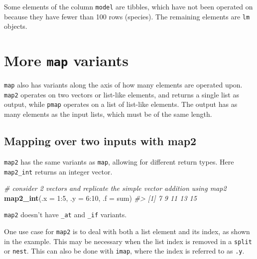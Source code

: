 \documentclass[]{book}
\newenvironment{Shaded}{}{}
\newcommand{\CommentTok}[1]{\textcolor[rgb]{0.38,0.63,0.69}{\textit{#1}}}
\newcommand{\DataTypeTok}[1]{\textcolor[rgb]{0.56,0.13,0.00}{#1}}
\newcommand{\DecValTok}[1]{\textcolor[rgb]{0.25,0.63,0.44}{#1}}
\newcommand{\KeywordTok}[1]{\textcolor[rgb]{0.00,0.44,0.13}{\textbf{#1}}}
\newcommand{\NormalTok}[1]{#1}
\newcommand{\OperatorTok}[1]{\textcolor[rgb]{0.40,0.40,0.40}{#1}}
\begin{document}
Some elements of the column \texttt{model} are tibbles, which have not been operated on because they have fewer than 100 rows (species). The remaining elements are \texttt{lm} objects.

\hypertarget{more-map-variants}{%
\section{\texorpdfstring{More \texttt{map} variants}{More map variants}}\label{more-map-variants}}

\texttt{map} also has variants along the axis of how many elements are operated upon. \texttt{map2} operates on two vectors or list-like elements, and returns a single list as output, while \texttt{pmap} operates on a list of list-like elements.
The output has as many elements as the input lists, which must be of the same length.

\hypertarget{mapping-over-two-inputs-with-map2}{%
\subsection{Mapping over two inputs with map2}\label{mapping-over-two-inputs-with-map2}}

\texttt{map2} has the same variants as \texttt{map}, allowing for different return types.
Here \texttt{map2\_int} returns an integer vector.

\begin{Shaded}
\begin{Highlighting}[]
\CommentTok{# consider 2 vectors and replicate the simple vector addition using map2}
\KeywordTok{map2_int}\NormalTok{(}\DataTypeTok{.x =} \DecValTok{1}\OperatorTok{:}\DecValTok{5}\NormalTok{,}
         \DataTypeTok{.y =} \DecValTok{6}\OperatorTok{:}\DecValTok{10}\NormalTok{,}
         \DataTypeTok{.f =}\NormalTok{ sum)}
\CommentTok{#> [1]  7  9 11 13 15}
\end{Highlighting}
\end{Shaded}

\texttt{map2} doesn't have \texttt{\_at} and \texttt{\_if} variants.

One use case for \texttt{map2} is to deal with both a list element and its index, as shown in the example. This may be necessary when the list index is removed in a \texttt{split} or \texttt{nest}. This can also be done with \texttt{imap}, where the index is referred to as \texttt{.y}.
\end{document}
